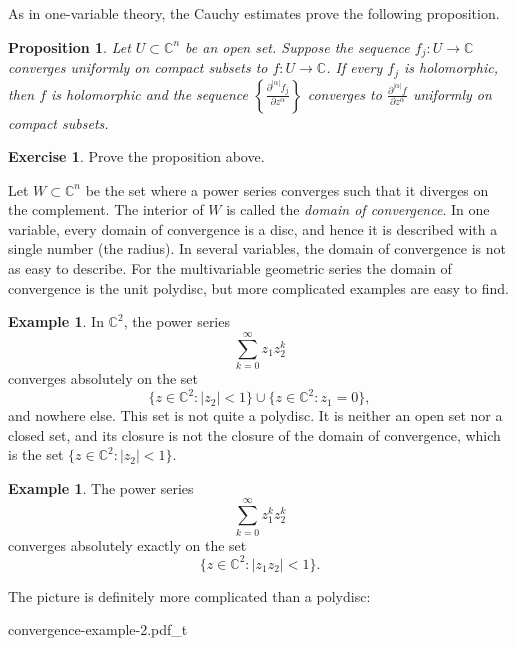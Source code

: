 \documentclass[12pt,openany]{book}
\newcommand{\sabs}[1]{\lvert {#1} \rvert}
\newcommand{\C}{{\mathbb{C}}}
\newcommand{\myindex}[1]{#1\index{#1}}
\theoremstyle{plain}
\newtheorem{prop}[thm]{Proposition}
\theoremstyle{remark}
\theoremstyle{definition}
\newenvironment{exbox}{%
    \def\FrameCommand{\vrule width 1pt \relax\hspace{10pt}}%
    \MakeFramed {\advance \hsize -\width \FrameRestore}%
}{%
    \endMakeFramed
}
\newenvironment{myfig}{%
    \begin{center}
}{%
    \end{center}
}
\theoremstyle{exercise}
\newtheorem{exercise}{Exercise}[section]
\theoremstyle{example}
\newtheorem{example}[thm]{Example}
\begin{document}
As in one-variable theory, the Cauchy estimates prove the following
proposition.

\begin{prop}
Let $U \subset \C^n$ be an open set.
Suppose the sequence $f_j \colon U \to \C$ converges uniformly on compact subsets
to $f \colon U \to \C$.  If every $f_j$ is holomorphic, then $f$ is
holomorphic and 
the sequence
$\left\{ \frac{\partial^{\sabs{\alpha}} f_j}{\partial z^\alpha}\right\}$
converges to
$\frac{\partial^{\sabs{\alpha}} f}{\partial z^\alpha}$ uniformly on compact
subsets.
\end{prop}

\begin{exbox}
\begin{exercise}
Prove the proposition above.
\end{exercise}
\end{exbox}

Let $W \subset \C^n$ be the set where a power series converges
such that it diverges on the complement.  The interior of $W$
is called the
\emph{\myindex{domain of convergence}}.
In one variable, every domain of convergence is a disc, and hence it is
described with a single number (the radius).
In several variables, the domain of convergence
is not as easy to describe.
For the multivariable geometric series 
the domain of convergence is the unit polydisc, but more
complicated examples are easy to find.

\begin{example}
In $\C^2$, the power series
\begin{equation*}
\sum_{k=0}^\infty z_1 z_2^k
\end{equation*}
converges absolutely on the set
\begin{equation*}
\bigl\{ z \in \C^2 : \sabs{z_2} < 1 \bigr\}
\cup
\bigl\{ z \in \C^2 : z_1 = 0 \bigr\} ,
\end{equation*}
and nowhere else.
This set is not quite a polydisc.  It is neither an open set nor a closed set,
and its closure is not the closure of the domain of convergence,
which is the set $\bigl\{ z \in \C^2 : \sabs{z_2} < 1 \bigr\}$.
\end{example}

\begin{example}
The power series
\begin{equation*}
\sum_{k=0}^\infty z_1^k z_2^k
\end{equation*}
converges absolutely exactly on the set
\begin{equation*}
\bigl\{ z \in \C^2 : \sabs{z_1 z_2} < 1 \bigr\} .
\end{equation*}

\pagebreak[2]
The picture is definitely more complicated than a polydisc:

\medskip

\begin{myfig}
{convergence-example-2.pdf_t}
\end{myfig}
\end{example}
\end{document}
